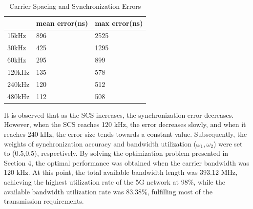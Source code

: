\documentclass[english]{cccconf}
\begin{document}
\begin{table}[!htb]
	\centering
	\caption{Carrier Spacing and Synchronization Errors}
	\label{tab1}
	\begin{tabular}{l|l|l}
		\hline
		 & \textbf{mean error(ns)}& \textbf{max error(ns)} \\
		\hline
		15kHz 
		& 896
		& 2525 \\
		\hline
		30kHz
		& 425
		& 1295 \\
		\hline
		60kHz
		& 295
		& 899 \\
		\hline
		120kHz
		& 135
		& 578 \\
		\hline
		240kHz
		& 120
		& 512 \\
		\hline
			480kHz
		& 112
		& 508 \\
		\hline
	\end{tabular}
\end{table}


It is observed that as the SCS increases, the synchronization error decreases. However, when the SCS reaches 120 kHz, the error decreases slowly, and when it reaches 240 kHz, the error size tends towards a constant value. Subsequently, the weights of synchronization accuracy and bandwidth utilization ($\omega_1,\omega_2$) were set to (0.5,0.5), respectively. By solving the optimization problem presented in Section 4, the optimal performance was obtained when the carrier bandwidth was 120 kHz. At this point, the total available bandwidth length was 393.12 MHz, achieving the highest utilization rate of the 5G network at 98\%, while the available bandwidth utilization rate was 83.38\%, fulfilling most of the transmission requirements.
\end{document}
